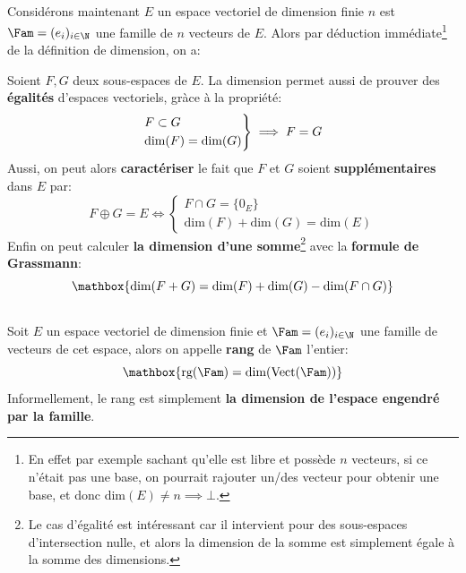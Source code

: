 \subsection*{}
Considérons maintenant \(E\) un espace vectoriel de dimension finie \(n\) est \(\Fam = (e_i)_{i \in \N}\) une famille de \(n\) vecteurs de \(E\). Alors par déduction immédiate\footnote[2]{En effet par exemple sachant qu'elle est libre et possède \(n\) vecteurs, si ce n'était pas une base, on pourrait rajouter un/des vecteur pour obtenir une base, et donc dim\((E) \neq n \implies \bot\).} de la définition de dimension, on a:
\begin{center}
\end{center}
Soient \(F, G\) deux sous-espaces de \(E\).\+
La dimension permet aussi de prouver des \textbf{égalités} d'espaces vectoriels, gràce à la propriété:
\[
   \begin{rcases}
      F \subset G \\
      \text{dim}(F) = \text{dim}(G)
   \end{rcases}\implies F = G
\]
Aussi, on peut alors \textbf{caractériser} le fait que \(F\) et \(G\) soient \textbf{supplémentaires} dans \(E\) par:
\[
   F \oplus G = E \Longleftrightarrow \begin{cases}
      F \cap G = \{0_E\}\\
      \text{dim}(F) + \text{dim}(G) = \text{dim}(E)
   \end{cases}
\]
Enfin on peut calculer \textbf{la dimension d'une somme}\footnote[1]{Le cas d'égalité est intéressant car il intervient pour des sous-espaces d'intersection nulle, et alors la dimension de la somme est simplement égale à la somme des dimensions.} avec la \textbf{formule de Grassmann}:
\[
   \mathbox{\text{dim}(F + G) = \text{dim}(F) + \text{dim}(G) - \text{dim}(F \cap G)}   
\]

\subsection*{}
Soit \(E\) un espace vectoriel de dimension finie et \(\Fam = (e_i)_{i \in \N}\) une famille de vecteurs de cet espace, alors on appelle \textbf{rang} de \(\Fam\) l'entier:
\[
   \mathbox{\text{rg}(\Fam) = \text{dim}(\text{Vect}(\Fam))}   
\]
Informellement, le rang est simplement \textbf{la dimension de l'espace engendré par la famille}.

